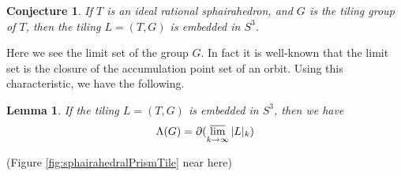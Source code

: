 \documentclass[suppldata, dvipdfmx]{interact}
\theoremstyle{plain}%
\newtheorem{lemma}[theorem]{Lemma}
\newtheorem{conjecture}[theorem]{Conjecture}
\theoremstyle{definition}
\theoremstyle{remark}
\theoremstyle{problemstyle}
\begin{document}
\begin{conjecture}
If $T$ is an ideal rational sphairahedron, and $G$ is the tiling group of $T$, then the tiling $L=(T,G)$ is embedded in $S^3$.
\end{conjecture}

Here we see the limit set of the group $G$.  In fact it is well-known that the limit set is the closure of the accumulation point set of an orbit.  Using this characteristic, we have the following.

\begin{lemma}
If the tiling $L=(T,G)$ is embedded in $S^3$, then we have
\[
\Lambda(G) =\partial(\varlimsup_{k\to\infty} |L|_k)
\]
\end{lemma}

\noindent(Figure \ref{fig:sphairahedralPrismTile}
 near here)
\end{document}
